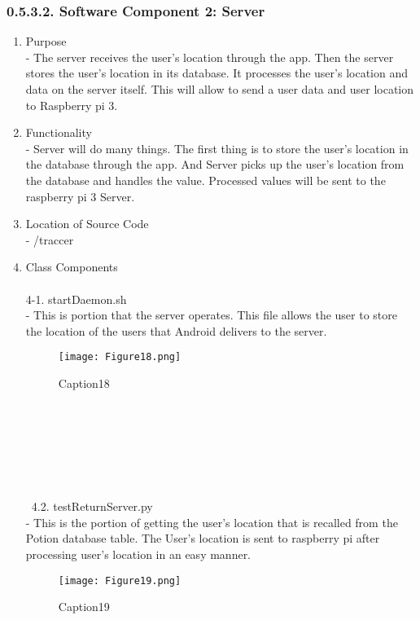 \documentclass[10pt,a4paper,twocolumn]{report}
\begin{document}
	\subsubsection{0.5.3.2. Software Component 2: Server}
		\begin{enumerate}
			\item Purpose\\
			- The server receives the user’s location through the app. Then the server stores the user’s location in its database. It processes the user’s location and data on the server itself. This will allow to send a user data and user location to Raspberry pi 3.\\
			\item Functionality \\
			- Server will do many things. The first thing is to store the user’s location in the database through the app. And Server picks up the user’s location from the database and handles the value. Processed values will be sent to the raspberry pi 3 Server. \\
			\item Location of Source Code \\
			- /traccer \\
			\item Class Components \\\\
			4-1. startDaemon.sh \\
			- This is portion that the server operates. This file allows the user to store the location of the users that Android delivers to the server. \\
			\begin{figure}[h]
				\texttt{[image: Figure18.png]}
				\caption{Caption18}
				\label{fig18}
			\end{figure}
			\\\\\\\\\\\\\
			4.2. testReturnServer.py \\
			- This is the portion of getting the user’s location that is recalled from the Potion database table. The User’s location is sent to raspberry pi after processing user’s location in an easy manner. \\
			\begin{figure}[h]
				\texttt{[image: Figure19.png]}
				\caption{Caption19}
				\label{fig19}

\end{figure}
\end{enumerate}
\end{document}
